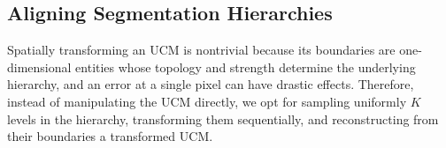 \documentclass[10pt,journal,cspaper,compsoc]{IEEEtran}
\begin{document}
\subsection{Aligning Segmentation Hierarchies}
\label{sec:align_seg}






Spatially transforming an UCM is nontrivial because its boundaries are one-dimensional entities whose topology and strength determine the underlying hierarchy, and an error at a single pixel can have drastic effects. 
Therefore, instead of manipulating the UCM directly, we opt for sampling uniformly $K$ levels in the hierarchy, transforming them sequentially, and reconstructing from their boundaries a transformed UCM. 
\end{document}
